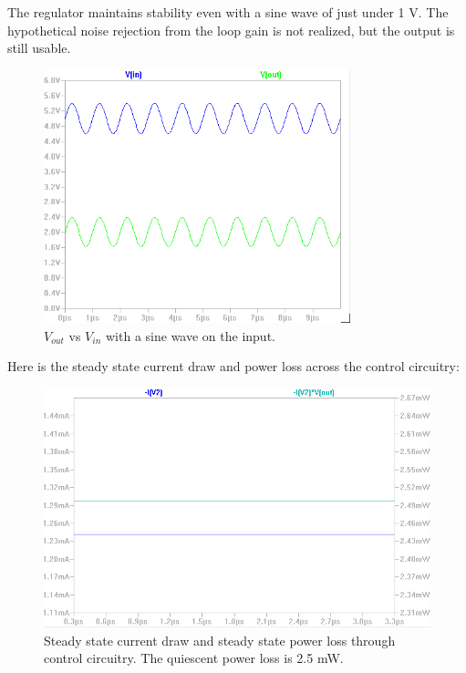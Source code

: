 \documentclass[10pt]{amsart}
\begin{document}
\newpage

The regulator maintains stability even with a sine wave of just under 1 V. The hypothetical noise rejection from the loop gain is not realized, but the output is still usable. 

\begin{figure}[h]
	\begin{center}
		\includegraphics[width=3.5in]{Media/sin.png}
	\end{center}
	\caption{$V_{out} $ vs $V_{in}$ with a sine wave on the input.}
	\label{fig:pidfb}
\end{figure}

Here is the steady state current draw and power loss across the control circuitry:

\begin{figure}[h]
	\begin{center}
		\includegraphics[width=4.5in]{Media/pwr.png}
	\end{center}
	\caption{Steady state current draw and steady state power loss through control circuitry. The quiescent power loss is 2.5 mW.}
	\label{fig:pidfb}
\end{figure}
\end{document}
